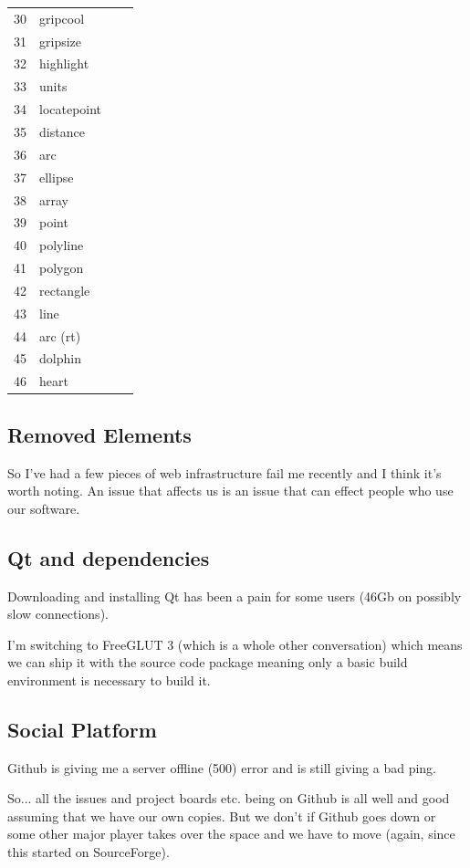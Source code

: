 \documentclass{report}
\begin{document}
\begin{tabular}{l l l l}
30 & gripcool &  &  \\
31 & gripsize &  &  \\
32 & highlight &  &  \\
33 & units &  &  \\
34 & locatepoint &  &  \\
35 & distance &  &  \\
36 & arc &  &  \\
37 & ellipse &  &  \\
38 & array &  &  \\
39 & point &  &  \\
40 & polyline &  &  \\
41 & polygon &  &  \\
42 & rectangle &  &  \\
43 & line &  &  \\
44 & arc (rt) &  &  \\
45 & dolphin &  &  \\
46 & heart  & &
\end{tabular}

\subsection{Removed Elements}

So I've had a few pieces of web infrastructure fail me recently and
I think it's worth noting. An issue that affects us is an issue that
can effect people who use our software.

\subsection{Qt and dependencies}

Downloading and installing Qt has been a pain for some users
(46Gb on possibly slow connections).

I'm switching to FreeGLUT 3 (which is a whole other conversation) which means we
can ship it with the source code package meaning only a basic build
environment is necessary to build it.

\subsection{Social Platform}

Github is giving me a server offline (500) error and is still giving a bad ping.

So... all the issues and project boards etc. being on Github is all well and good assuming that we have our own copies. But we don't if Github goes down or some other major player takes over the space and we have to move (again, since this started on SourceForge).
\end{document}
